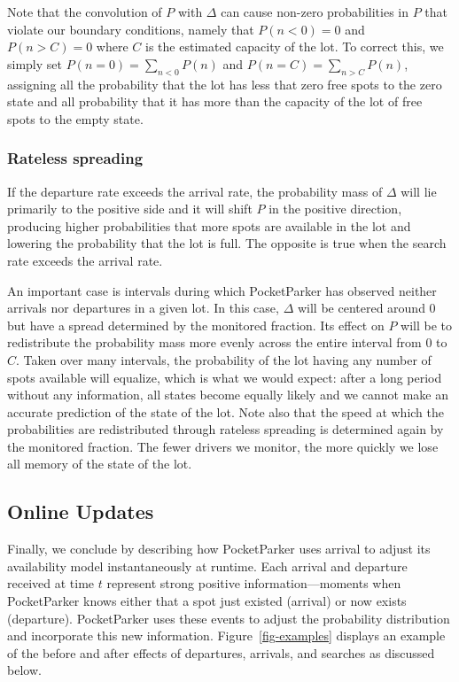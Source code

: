 Note that the convolution of $P$ with $\Delta$ can cause non-zero
probabilities in $P$ that violate our boundary conditions, namely that
$P(n < 0) = 0$ and $P(n > C) = 0$ where $C$ is the estimated capacity of
the lot. To correct this, we simply set $P(n = 0) = \sum_{n < 0} P(n)$
and $P(n = C) = \sum_{n > C} P(n)$, assigning all the probability that
the lot has less that zero free spots to the zero state and all probability
that it has more than the capacity of the lot of free spots to the empty
state.

\subsubsection{Rateless spreading}

If the departure rate exceeds the arrival rate, the probability mass of
$\Delta$ will lie primarily to the positive side and it will shift $P$ in the
positive direction, producing higher probabilities that more spots are
available in the lot and lowering the probability that the lot is full. The
opposite is true when the search rate exceeds the arrival rate.

An important case is intervals during which PocketParker has observed neither
arrivals nor departures in a given lot. In this case, $\Delta$ will be
centered around $0$ but have a spread determined by the monitored fraction.
Its effect on $P$ will be to redistribute the probability mass more evenly
across the entire interval from $0$ to $C$. Taken over many intervals, the
probability of the lot having any number of spots available will equalize,
which is what we would expect: after a long period without any information,
all states become equally likely and we cannot make an accurate prediction of
the state of the lot. Note also that the speed at which the probabilities are
redistributed through rateless spreading is determined again by the monitored
fraction. The fewer drivers we monitor, the more quickly we lose all memory
of the state of the lot.

\subsection{Online Updates}
\label{subsec-online}

Finally, we conclude by describing how PocketParker uses arrival to adjust
its availability model instantaneously at runtime. Each arrival and departure
received at time $t$ represent strong positive information---moments when
PocketParker knows either that a spot just existed (arrival) or now exists
(departure). PocketParker uses these events to adjust the probability
distribution and incorporate this new information. Figure~\ref{fig-examples}
displays an example of the before and after effects of departures, arrivals,
and searches as discussed below.

